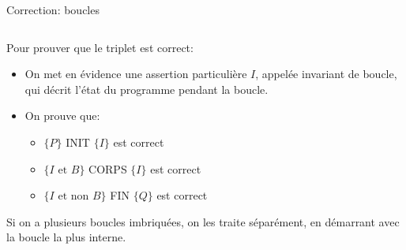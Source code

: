 \begin{frame}{Correction: boucles}

\begin{columns}
\begin{column}{5cm}
\begin{center}\footnotesize
{}
\end{center}
\end{column}
\begin{column}{5cm}
\begin{center}\footnotesize
{}
\end{center}
\end{column}
\end{columns}

Pour prouver que le triplet est correct:
\begin{itemize}
\item On met en évidence une assertion particulière $I$, appelée
  \alert{invariant de boucle}, qui décrit l'état du programme pendant
  la boucle.
\item On prouve que:
\begin{itemize}
\item $\{P\}$ INIT $\{I\}$ est correct%
\item $\{I \mbox{ et }B\}$ CORPS $\{I\}$ est correct%
\item $\{I \mbox{ et non } B\}$ FIN $\{Q\}$ est correct%
\end{itemize}
\end{itemize}

\bigskip

Si on a plusieurs boucles imbriquées, on les traite séparément, en
démarrant avec la boucle la plus interne.

\end{frame}

